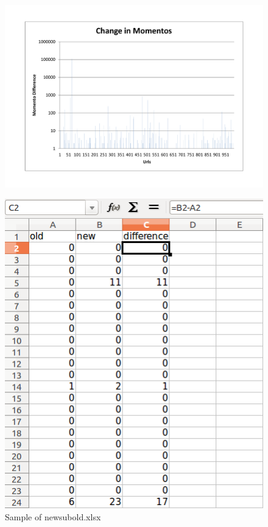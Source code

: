 \documentclass[12pt]{article}
\begin{document}
\begin{figure}[h!]
\centering
\includegraphics[width=6.5in]{difference.pdf}
\end{figure}

\begin{figure}[h!]
\centering
\includegraphics[width=5in]{difference.png}
\caption{Sample of newsubold.xlsx}
\end{figure}
\end{document}
